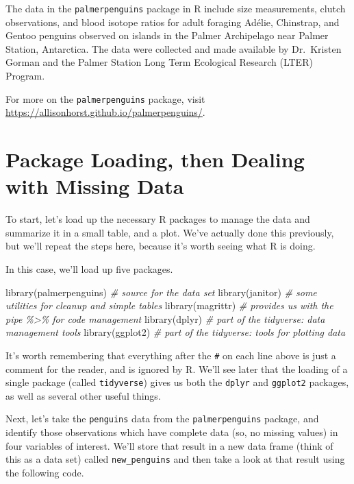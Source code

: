 \documentclass[
]{book}
\newenvironment{Shaded}{\begin{snugshade}}{\end{snugshade}}
\newcommand{\CommentTok}[1]{\textcolor[rgb]{0.56,0.35,0.01}{\textit{#1}}}
\newcommand{\FunctionTok}[1]{\textcolor[rgb]{0.00,0.00,0.00}{#1}}
\newcommand{\NormalTok}[1]{#1}
\begin{document}
The data in the \texttt{palmerpenguins} package in R include size measurements, clutch observations, and blood isotope ratios for adult foraging Adélie, Chinstrap, and Gentoo penguins observed on islands in the Palmer Archipelago near Palmer Station, Antarctica. The data were collected and made available by Dr.~Kristen Gorman and the Palmer Station Long Term Ecological Research (LTER) Program.

For more on the \texttt{palmerpenguins} package, visit \url{https://allisonhorst.github.io/palmerpenguins/}.

\hypertarget{package-loading-then-dealing-with-missing-data}{%
\section{Package Loading, then Dealing with Missing Data}\label{package-loading-then-dealing-with-missing-data}}

To start, let's load up the necessary R packages to manage the data and summarize it in a small table, and a plot. We've actually done this previously, but we'll repeat the steps here, because it's worth seeing what R is doing.

In this case, we'll load up five packages.

\begin{Shaded}
\begin{Highlighting}[]
\FunctionTok{library}\NormalTok{(palmerpenguins)  }\CommentTok{\# source for the data set}
\FunctionTok{library}\NormalTok{(janitor)         }\CommentTok{\# some utilities for cleanup and simple tables}
\FunctionTok{library}\NormalTok{(magrittr)        }\CommentTok{\# provides us with the pipe \%\textgreater{}\% for code management}
\FunctionTok{library}\NormalTok{(dplyr)           }\CommentTok{\# part of the tidyverse: data management tools}
\FunctionTok{library}\NormalTok{(ggplot2)         }\CommentTok{\# part of the tidyverse: tools for plotting data}
\end{Highlighting}
\end{Shaded}

It's worth remembering that everything after the \texttt{\#} on each line above is just a comment for the reader, and is ignored by R. We'll see later that the loading of a single package (called \texttt{tidyverse}) gives us both the \texttt{dplyr} and \texttt{ggplot2} packages, as well as several other useful things.

Next, let's take the \texttt{penguins} data from the \texttt{palmerpenguins} package, and identify those observations which have complete data (so, no missing values) in four variables of interest. We'll store that result in a new data frame (think of this as a data set) called \texttt{new\_penguins} and then take a look at that result using the following code.
\end{document}
